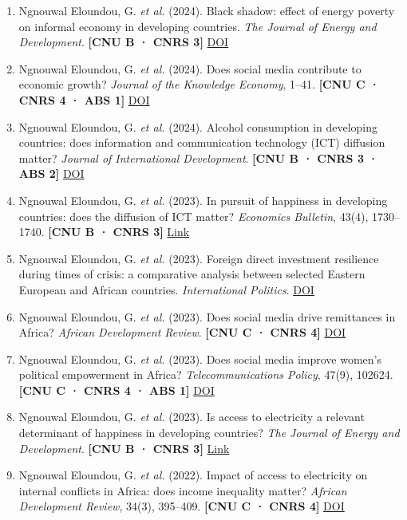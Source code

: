 \documentclass[
  french,
  10pt,
  letterpaper,
  DIV=11,
  numbers=noendperiod]{scrartcl}
\newcommand{\rank}[1]{{\small\color{accent}\textbf{[#1]}}}
\begin{document}
\begin{enumerate}[leftmargin=1.6em, itemsep=3pt]
\item Ngnouwal Eloundou, G. \textit{et al.} (2024). Black shadow: effect of energy poverty on informal economy in developing countries. \textit{The Journal of Energy and Development}. \rank{CNU B · CNRS 3} \href{https://doi.org/10.56476/jed.v49i1.21}{DOI}

\item Ngnouwal Eloundou, G. \textit{et al.} (2024). Does social media contribute to economic growth? \textit{Journal of the Knowledge Economy}, 1–41. \rank{CNU C · CNRS 4 · ABS 1} \href{https://doi.org/10.1007/s13132-023-01419-1}{DOI}

\item Ngnouwal Eloundou, G. \textit{et al.} (2024). Alcohol consumption in developing countries: does information and communication technology (ICT) diffusion matter? \textit{Journal of International Development}. \rank{CNU B · CNRS 3 · ABS 2} \href{https://doi.org/10.1002/jid.3858}{DOI}

\item Ngnouwal Eloundou, G. \textit{et al.} (2023). In pursuit of happiness in developing countries: does the diffusion of ICT matter? \textit{Economics Bulletin}, 43(4), 1730–1740. \rank{CNU B · CNRS 3} \href{https://econpapers.repec.org/article/eblecbull/eb22-00799.htm}{Link}

\item Ngnouwal Eloundou, G. \textit{et al.} (2023). Foreign direct investment resilience during times of crisis: a comparative analysis between selected Eastern European and African countries. \textit{International Politics}. \href{https://doi.org/10.18485/iipe_mp.2023.74.1189.4}{DOI}

\item Ngnouwal Eloundou, G. \textit{et al.} (2023). Does social media drive remittances in Africa? \textit{African Development Review}. \rank{CNU C · CNRS 4} \href{https://doi.org/10.1111/1467-8268.12717}{DOI}

\item Ngnouwal Eloundou, G. \textit{et al.} (2023). Does social media improve women's political empowerment in Africa? \textit{Telecommunications Policy}, 47(9), 102624. \rank{CNU C · CNRS 4 · ABS 1} \href{https://doi.org/10.1016/j.telpol.2023.102624}{DOI}

\item Ngnouwal Eloundou, G. \textit{et al.} (2023). Is access to electricity a relevant determinant of happiness in developing countries? \textit{The Journal of Energy and Development}. \rank{CNU B · CNRS 3} \href{https://www.jstor.org/stable/27284853}{Link}

\item Ngnouwal Eloundou, G. \textit{et al.} (2022). Impact of access to electricity on internal conflicts in Africa: does income inequality matter? \textit{African Development Review}, 34(3), 395–409. \rank{CNU C · CNRS 4} \href{https://doi.org/10.1111/1467-8268.12664}{DOI}

\end{enumerate}
\end{document}
